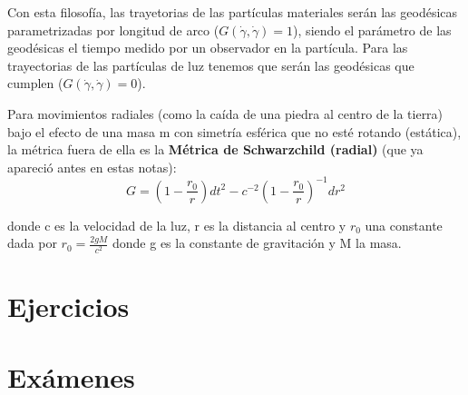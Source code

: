 \documentclass[palatino, bibnumbers]{apuntes}
\begin{document}
\indent Con esta filosofía, las trayetorias de las partículas materiales serán las geodésicas parametrizadas por longitud de arco ($G(\dot{\gamma},\dot{\gamma})=1$), siendo el parámetro de las geodésicas el tiempo medido por un observador en la partícula.
Para las trayectorias de las partículas de luz tenemos que serán las geodésicas que cumplen ($G(\dot{\gamma},\dot{\gamma})=0$).
\begin{example}Para movimientos radiales (como la caída de una piedra al centro de la tierra) bajo el efecto de una masa m con simetría esférica que no esté rotando (estática), la métrica fuera de ella es la \textbf{Métrica de Schwarzchild (radial)} (que ya apareció antes en estas notas):
	$$G=\left(1-\frac{r_0}{r}\right)dt^2-c^{-2}\left(1-\frac{r_0}{r}\right)^{-1}dr^2$$
\end{example}
donde c es la velocidad de la luz, r es la distancia al centro y $r_0$ una constante dada por $r_0=\frac{2gM}{c^2}$ donde g es la constante de gravitación y M la masa.
\appendix

\chapter{Ejercicios}

\chapter{Exámenes}


\printindex
\end{document}
